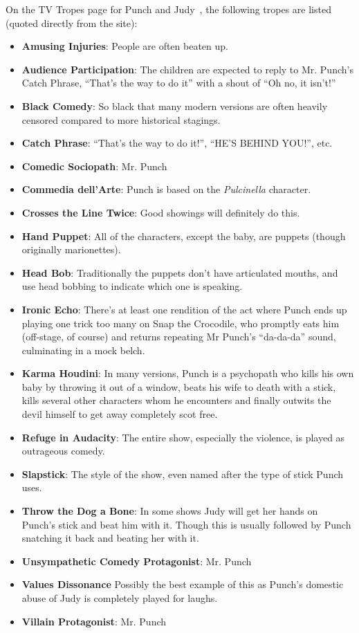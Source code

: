 \documentclass[11pt]{report}
\begin{document}
On the TV Tropes page for Punch and Judy~\citep{pj-tropes}, the following tropes
are listed (quoted
directly from the site):

\begin{itemize}
  \item \textbf{Amusing Injuries}: People are often beaten up.
  \item \textbf{Audience Participation}: The children are expected to reply to Mr. Punch's Catch Phrase, ``That's the way to do it'' with a shout of ``Oh no, it isn't!''
  \item \textbf{Black Comedy}: So black that many modern versions are often heavily censored compared to more historical stagings.
  \item \textbf{Catch Phrase}: ``That's the way to do it!'', ``HE'S BEHIND
    YOU!'', etc.
  \item \textbf{Comedic Sociopath}: Mr. Punch
  \item \textbf{Commedia dell'Arte}: Punch is based on the \emph{Pulcinella} character.
  \item \textbf{Crosses the Line Twice}: Good showings will definitely do this.
  \item \textbf{Hand Puppet}: All of the characters, except the baby, are
    puppets (though originally marionettes).
  \item \textbf{Head Bob}: Traditionally the puppets don't have articulated mouths, and use head bobbing to indicate which one is speaking.
  \item \textbf{Ironic Echo}: There's at least one rendition of the act where Punch ends up playing one trick too many on Snap the Crocodile, who promptly eats him (off-stage, of course) and returns repeating Mr Punch's ``da-da-da'' sound, culminating in a mock belch.
  \item \textbf{Karma Houdini}: In many versions, Punch is a psychopath who kills his own baby by throwing it out of a window, beats his wife to death with a stick, kills several other characters whom he encounters and finally outwits the devil himself to get away completely scot free.
  \item \textbf{Refuge in Audacity}: The entire show, especially the violence, is played as outrageous comedy.
  \item \textbf{Slapstick}: The style of the show, even named after the type of stick Punch uses.
  \item \textbf{Throw the Dog a Bone}: In some shows Judy will get her hands on Punch's stick and beat him with it. Though this is usually followed by Punch snatching it back and beating her with it.
  \item \textbf{Unsympathetic Comedy Protagonist}: Mr. Punch
  \item \textbf{Values Dissonance} Possibly the best example of this as Punch's domestic abuse of Judy is completely played for laughs.
  \item \textbf{Villain Protagonist}: Mr. Punch
\end{itemize}
\end{document}
